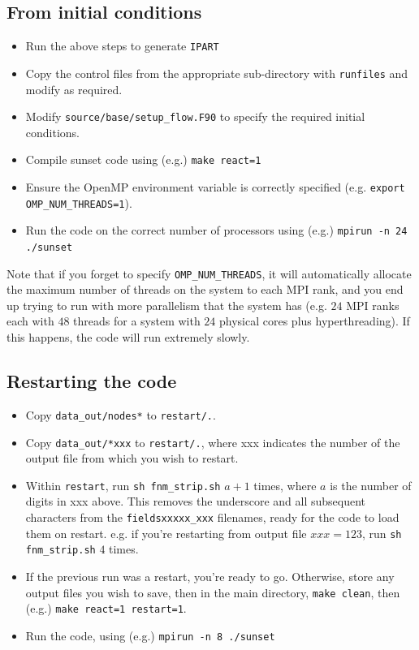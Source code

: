 \documentclass[notitlepage]{revtex4-1}
\begin{document}
\subsection{From initial conditions}

\begin{itemize}
\item Run the above steps to generate \verb|IPART|
\item Copy the control files from the appropriate sub-directory with \verb|runfiles| and modify as required.
\item Modify \verb|source/base/setup_flow.F90| to specify the required initial conditions.
\item Compile sunset code using (e.g.) \verb|make react=1|
\item Ensure the OpenMP environment variable is correctly specified (e.g. \verb|export OMP_NUM_THREADS=1|).
\item Run the code on the correct number of processors using (e.g.) \verb|mpirun -n 24 ./sunset|
\end{itemize}

Note that if you forget to specify \verb|OMP_NUM_THREADS|, it will automatically allocate the maximum number of threads on the system to each MPI rank, and you end up trying to run with more parallelism that the system has (e.g. $24$ MPI ranks each with $48$ threads for a system with $24$ physical cores plus hyperthreading). If this happens, the code will run extremely slowly.

\subsection{Restarting the code}

\begin{itemize}
\item Copy \verb|data_out/nodes*| to \verb|restart/.|.
\item Copy \verb|data_out/*xxx| to \verb|restart/.|, where xxx indicates the number of the output file from which you wish to restart.
\item Within \verb|restart|, run \verb|sh fnm_strip.sh| $a+1$ times, where $a$ is the number of digits in xxx above. This removes the underscore and all subsequent characters from the \verb|fieldsxxxxx_xxx| filenames, ready for the code to load them on restart. e.g. if you're restarting from output file $xxx=123$, run \verb|sh fnm_strip.sh| $4$ times. 
\item If the previous run was a restart, you're ready to go. Otherwise, store any output files you wish to save, then in the main directory, \verb|make clean|, then (e.g.) \verb|make react=1 restart=1|.
\item Run the code, using (e.g.) \verb|mpirun -n 8 ./sunset|
\end{itemize}
\end{document}
